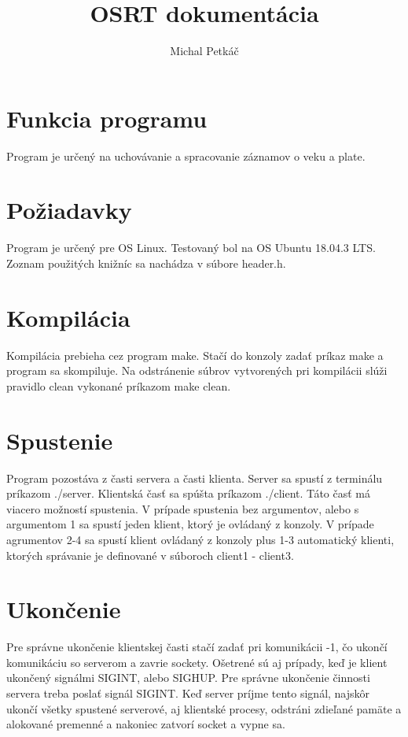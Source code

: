 \documentclass{article}
\title{OSRT dokumentácia}
\author{Michal Petkáč}
\begin{document}
\maketitle
\section{Funkcia programu}
Program je určený na uchovávanie a spracovanie záznamov o veku a plate.

\section{Požiadavky}
Program je určený pre OS Linux. Testovaný bol na OS Ubuntu 18.04.3 LTS. 
\newline
Zoznam použitých knižníc sa nachádza v súbore header.h.

\section{Kompilácia}
Kompilácia prebieha cez program make. Stačí do konzoly zadať príkaz make a program sa skompiluje.
Na odstránenie súbrov vytvorených pri kompilácii slúži pravidlo clean vykonané príkazom make clean.

\section{Spustenie}
Program pozostáva z časti servera a časti klienta. Server sa spustí z terminálu príkazom ./server. 
\newline
Klientská časť sa spúšta príkazom ./client. Táto časť má viacero možností spustenia. V prípade
spustenia bez argumentov, alebo s argumentom 1 sa spustí jeden klient, ktorý je ovládaný z konzoly.
V prípade agrumentov 2-4 sa spustí klient ovládaný z konzoly plus 1-3 automatický klienti, ktorých
správanie je definované v súboroch client1 - client3.

\section{Ukončenie}
Pre správne ukončenie klientskej časti stačí zadať pri komunikácii -1, čo ukončí komunikáciu so
serverom a zavrie sockety. Ošetrené sú aj prípady, keď je klient ukončený signálmi SIGINT, alebo
SIGHUP.
\newline
Pre správne ukončenie činnosti servera treba poslať signál SIGINT. Keď server príjme tento signál,
najskôr ukončí všetky spustené serverové, aj klientské procesy, odstráni zdieľané pamäte a
alokované premenné a nakoniec zatvorí socket a vypne sa.
\end{document}

